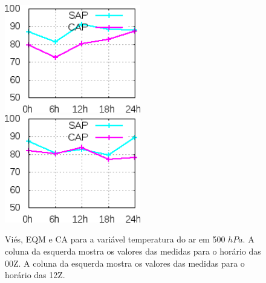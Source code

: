 \begin{figure}[!hbp]
\includegraphics[height=4.7cm]{./figs/CA500temp0Z.png}\hspace{1.0cm}\includegraphics[height=4.7cm]{./figs/CA500temp12Z.png}
\caption{Viés, EQM e CA para a variável temperatura do ar em 500 $hPa$. A coluna da esquerda mostra os valores das medidas para o horário das 00Z. A coluna da esquerda mostra os valores das medidas para o horário das 12Z.}
\label{fig56}
\end{figure}

